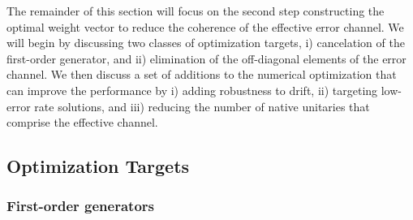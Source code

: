 \documentclass[aps,nofootinbib,pra,notitlepage,twocolumn]{revtex4-1}
\begin{document}
The remainder of this section will focus on the second step constructing the optimal weight vector to reduce the coherence of the effective error channel. We will begin by discussing two classes of optimization targets, i) cancelation of the first-order generator, and ii) elimination of the off-diagonal elements of the error channel. We then discuss a set of additions to the numerical optimization that can improve the performance by i) adding robustness to drift,  ii) targeting low-error rate solutions, and iii) reducing the number of native unitaries that comprise the effective channel. 


\subsection{Optimization Targets}
\subsubsection{First-order generators} %
\label{sub:first_order_generators}
\end{document}
